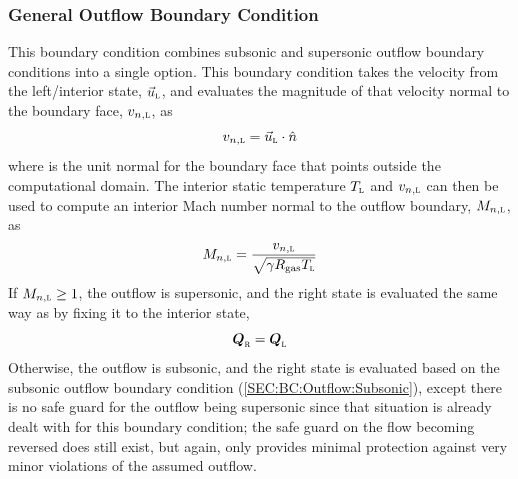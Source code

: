 \subsubsection{General Outflow Boundary Condition}
\label{SEC:BC:Outflow:General}

This boundary condition combines subsonic and supersonic outflow boundary
conditions into a single option.
%
This boundary condition takes the velocity from the left\slash interior state,
$\vec{u}_{\textsc{l}}$, and evaluates the magnitude of that velocity normal to the
boundary face, $v_{n,\textsc{l}}$, as
%
\[
  v_{n,\textsc{l}} = \vec{u}_{\textsc{l}}\cdot\hat{n}
\]
%
where \normal{} is the unit normal for the boundary face that points outside the
computational domain.
%
The interior static temperature $T_{\textsc{l}}$ and $v_{n,\textsc{l}}$ can then be used to
compute an interior Mach number normal to the outflow boundary, $M_{n,\textsc{l}}$, as
%
\[
  M_{n,\textsc{l}} = \frac{v_{n,\textsc{l}}}{\sqrt{\gamma R_{\textrm{gas}} T_{\textsc{l}}}}
\]
%
If $M_{n,\textsc{l}} \geq 1$, the outflow is supersonic, and the
right state is evaluated the same way as  by
fixing it to the interior state, \thatis \[ \cvVecR = \cvVecL \]
%
Otherwise, the outflow is subsonic, and the right state is evaluated based on
the subsonic outflow boundary condition (\ref{SEC:BC:Outflow:Subsonic}), except
there is no safe guard for the outflow being supersonic since that situation is
already dealt with for this boundary condition; the safe guard on the flow
becoming reversed does still exist, but again, only provides minimal protection
against very minor violations of the assumed outflow.


